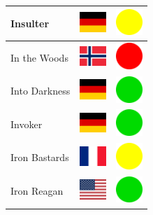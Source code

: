 \documentclass[12pt, a4paper, twoside]{report}
\begin{document}
\begin{center}
\begin{longtable}{|p{5cm}|p{2cm}|p{2cm}|}
Insulter & \includegraphics[width=1cm]{4x3/de} & \includegraphics[width=1cm]{likes/m} \\ \hline
In the Woods & \includegraphics[width=1cm]{4x3/no} & \includegraphics[width=1cm]{likes/n} \\ \hline
Into Darkness & \includegraphics[width=1cm]{4x3/de} & \includegraphics[width=1cm]{likes/y} \\ \hline
Invoker & \includegraphics[width=1cm]{4x3/de} & \includegraphics[width=1cm]{likes/y} \\ \hline
Iron Bastards & \includegraphics[width=1cm]{4x3/fr} & \includegraphics[width=1cm]{likes/m} \\ \hline
Iron Reagan & \includegraphics[width=1cm]{4x3/us} & \includegraphics[width=1cm]{likes/y} \\ \hline

\end{longtable}
\end{center}
\end{document}
